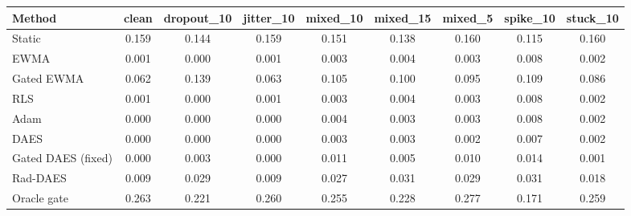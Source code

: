 \begin{tabular}{lcccccccc}
\toprule
Method & clean & dropout\_10 & jitter\_10 & mixed\_10 & mixed\_15 & mixed\_5 & spike\_10 & stuck\_10 \\
\midrule
Static & 0.159 & 0.144 & 0.159 & 0.151 & 0.138 & 0.160 & 0.115 & 0.160 \\
EWMA & 0.001 & 0.000 & 0.001 & 0.003 & 0.004 & 0.003 & 0.008 & 0.002 \\
Gated EWMA & 0.062 & 0.139 & 0.063 & 0.105 & 0.100 & 0.095 & 0.109 & 0.086 \\
RLS & 0.001 & 0.000 & 0.001 & 0.003 & 0.004 & 0.003 & 0.008 & 0.002 \\
Adam & 0.000 & 0.000 & 0.000 & 0.004 & 0.003 & 0.003 & 0.008 & 0.002 \\
DAES & 0.000 & 0.000 & 0.000 & 0.003 & 0.003 & 0.002 & 0.007 & 0.002 \\
Gated DAES (fixed) & 0.000 & 0.003 & 0.000 & 0.011 & 0.005 & 0.010 & 0.014 & 0.001 \\
Rad-DAES & 0.009 & 0.029 & 0.009 & 0.027 & 0.031 & 0.029 & 0.031 & 0.018 \\
Oracle gate & 0.263 & 0.221 & 0.260 & 0.255 & 0.228 & 0.277 & 0.171 & 0.259 \\
\bottomrule
\end{tabular}

